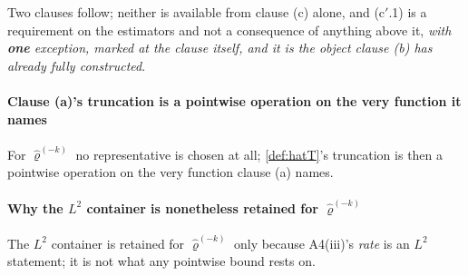Two clauses follow; neither is available from clause \textup{(c)} alone, and
\textup{(c$'$.1)} is a requirement on the estimators and not a consequence of anything above it, 
\emph{with \textbf{one} exception, marked at the clause itself, and it is the object clause \textup{(b)} has
already fully constructed}.

\paragraph{Clause \textup{(a)}'s truncation is a pointwise operation on the very function it names}

For $\hat\varrho^{(-k)}$ no representative is chosen at all; \cref{def:hatT}'s truncation is then a pointwise operation on the very
function clause \textup{(a)} names.

\paragraph{Why the $L^{2}$ container is nonetheless retained for $\hat\varrho^{(-k)}$}

The $L^{2}$ container is retained
for $\hat\varrho^{(-k)}$ only because A4(iii)'s \emph{rate} is an $L^{2}$ statement; it is not what any
pointwise bound rests on.
